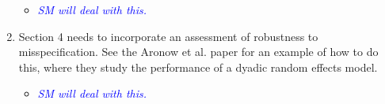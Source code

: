 \begin{enumerate}
	\begin{itemize}
		\item \textcolor{blue}{ \emph{
		SM will deal with this.
		}}
	\end{itemize}
	\item Section 4 needs to incorporate an assessment of robustness to misspecification.  See the Aronow et al. paper for an example of how to do this, where they study the performance of a dyadic random effects model.
	\begin{itemize}
		\item \textcolor{blue}{ \emph{
		SM will deal with this.
		}}
	\end{itemize}
\end{enumerate}
